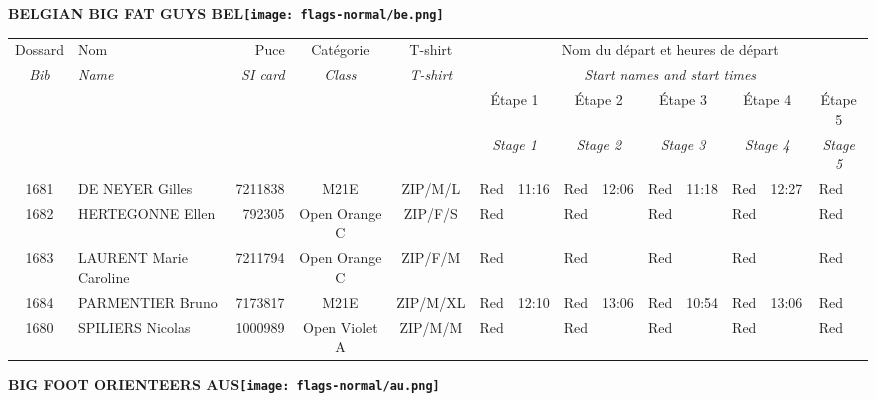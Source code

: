 \documentclass{report}
\begin{document}
\newpage
  \Huge \centering \bfseries BELGIAN BIG FAT GUYS  BEL\normalfont \footnotesize \sffamily \hfill \texttt{[image: flags-normal/be.png]} \newline 
  \begin{longtable}{|c|l|r|c|c|*{5}{cc|}}
    Dossard & Nom  & Puce    & Catégorie & T-shirt & \multicolumn{10}{c|}{Nom du départ et heures de départ} \\
    \itshape Bib     & \itshape Name & \itshape SI card & \itshape Class  & \itshape  T-shirt  & \multicolumn{10}{c|}{\itshape Start names and start times} \\
    \hline
    & & & & & \multicolumn{2}{c|}{Étape 1} & \multicolumn{2}{c|}{Étape 2} & \multicolumn{2}{c|}{Étape 3} & \multicolumn{2}{c|}{Étape 4} & \multicolumn{2}{c|}{Étape 5} \\
    & & & & & \multicolumn{2}{c|}{\itshape Stage 1} & \multicolumn{2}{c|}{\itshape Stage 2} & \multicolumn{2}{c|}{\itshape Stage 3} & \multicolumn{2}{c|}{\itshape Stage 4} & \multicolumn{2}{c|}{\itshape Stage 5} \\
    \hline
    1681 & DE NEYER Gilles & 7211838 & M21E & ZIP/M/L & Red & 11:16 & Red & 12:06 & Red & 11:18 & Red & 12:27 & Red &  \\
    1682 & HERTEGONNE Ellen & 792305 & Open Orange C & ZIP/F/S & Red &   & Red &   & Red &   & Red &   & Red &  \\
    1683 & LAURENT Marie Caroline & 7211794 & Open Orange C & ZIP/F/M & Red &   & Red &   & Red &   & Red &   & Red &  \\
    1684 & PARMENTIER Bruno & 7173817 & M21E & ZIP/M/XL & Red & 12:10 & Red & 13:06 & Red & 10:54 & Red & 13:06 & Red &  \\
    1680 & SPILIERS Nicolas & 1000989 & Open Violet A & ZIP/M/M & Red &   & Red &   & Red &   & Red &   & Red &  \\
  \end{longtable}
\newpage
  \Huge \centering \bfseries BIG FOOT ORIENTEERS  AUS\normalfont \footnotesize \sffamily \hfill \texttt{[image: flags-normal/au.png]} \newline 
\end{document}
